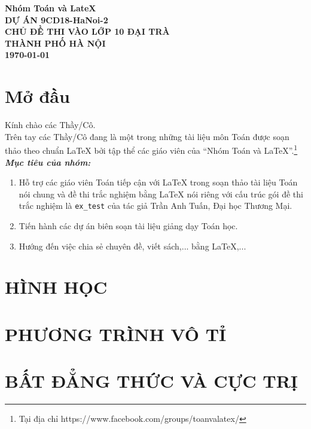 \documentclass[12pt,a4paper]{book}
\theoremstyle{nonumberplain}
\begin{document}
	\thispagestyle{empty}	
	\begin{tcolorbox}[width=.99\textwidth,height=.99\textheight,arc = 2mm, arc is angular]
		\begin{center}
			{\LARGE \bf \color{red} Nhóm Toán và LateX}\\
			\vspace*{.4cm}
			{\large \bf \color{red} DỰ ÁN 9CD18-HaNoi-2}\\	
			\vspace*{9cm}	
			{\bf \fontsize{40}{0}\selectfont C\fontsize{20}{0}\selectfont HỦ ĐỀ THI VÀO LỚP 10 ĐẠI TRÀ \\ THÀNH PHỐ HÀ NỘI}\\
			\vspace*{12cm}
			{\large \bf \today}
		\end{center}		
	\end{tcolorbox}
	
	\pagestyle{fancy}
	\chead{\empty}
	\rhead{\currfilename}
	\lfoot{\empty}
	
	\tableofcontents
	
	\chapter*{Mở đầu}
	Kính chào các Thầy/Cô.\\
	\vspace{0.6cm}
	\noindent Trên tay các Thầy/Cô đang là một trong những tài liệu môn Toán được soạn thảo theo chuẩn \LaTeX{} bởi tập thể các giáo viên của ``Nhóm Toán và LaTeX''.\footnote{Tại địa chỉ https://www.facebook.com/groups/toanvalatex/}\\
	\vspace{0.6cm}
	\noindent \textbf{\textit{Mục tiêu của nhóm:}} 
	\begin{enumerate}[\bfseries 1.]
		\item Hỗ trợ các giáo viên Toán tiếp cận với \LaTeX{} trong soạn thảo tài liệu Toán nói chung và đề thi trắc nghiệm bằng \LaTeX{} nói riêng với cấu trúc gói đề thi trắc nghiệm là \texttt{ex\_test} của tác giả Trần Anh Tuấn, Đại học Thương Mại.
		\item Tiến hành các dự án biên soạn tài liệu giảng dạy Toán học.
		\item Hướng đến việc chia sẻ chuyên đề, viết sách,... bằng \LaTeX,...
	\end{enumerate}

\setcounter{chapter}{5}
\chapter{HÌNH HỌC}


%
%

%



\chapter{PHƯƠNG TRÌNH VÔ TỈ}



%
\chapter{BẤT ĐẲNG THỨC VÀ CỰC TRỊ}



	
\end{document}
